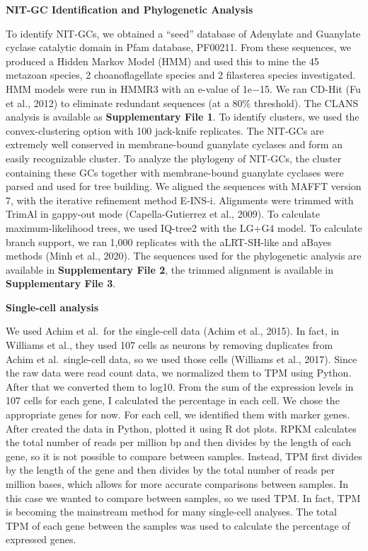 \documentclass[
  10pt,
  onecolumn]{article}
\begin{document}
\textbf{NIT-GC Identification and Phylogenetic Analysis}

To identify NIT-GCs, we obtained a ``seed'' database of Adenylate and
Guanylate cyclase catalytic domain in Pfam database, PF00211. From these
sequences, we produced a Hidden Markov Model (HMM) and used this to mine
the 45 metazoan species, 2 choanoflagellate species and 2 filasterea
species investigated. HMM models were run in HMMR3 with an e-value of
1e−15. We ran CD-Hit (Fu et al., 2012) to eliminate redundant sequences
(at a 80\% threshold). The CLANS analysis is available as
\textbf{Supplementary File 1}. To identify clusters, we used the
convex-clustering option with 100 jack-knife replicates. The NIT-GCs are
extremely well conserved in membrane-bound guanylate cyclases and form
an easily recognizable cluster. To analyze the phylogeny of NIT-GCs, the
cluster containing these GCs together with membrane-bound guanylate
cyclases were parsed and used for tree building. We aligned the
sequences with MAFFT version 7, with the iterative refinement method
E-INS-i. Alignments were trimmed with TrimAl in gappy-out mode
(Capella-Gutierrez et al., 2009). To calculate maximum-likelihood trees,
we used IQ-tree2 with the LG+G4 model. To calculate branch support, we
ran 1,000 replicates with the aLRT-SH-like and aBayes methods (Minh et
al., 2020). The sequences used for the phylogenetic analysis are
available in \textbf{Supplementary File 2}, the trimmed alignment is
available in \textbf{Supplementary File 3}.

\textbf{Single-cell analysis}

We used Achim et al.~for the single-cell data (Achim et al., 2015). In
fact, in Williams et al., they used 107 cells as neurons by removing
duplicates from Achim et al.~single-cell data, so we used those cells
(Williams et al., 2017). Since the raw data were read count data, we
normalized them to TPM using Python. After that we converted them to
log10. From the sum of the expression levels in 107 cells for each gene,
I calculated the percentage in each cell. We chose the appropriate genes
for now. For each cell, we identified them with marker genes. After
created the data in Python, plotted it using R dot plots. RPKM
calculates the total number of reads per million bp and then divides by
the length of each gene, so it is not possible to compare between
samples. Instead, TPM first divides by the length of the gene and then
divides by the total number of reads per million bases, which allows for
more accurate comparisons between samples. In this case we wanted to
compare between samples, so we used TPM. In fact, TPM is becoming the
mainstream method for many single-cell analyses. The total TPM of each
gene between the samples was used to calculate the percentage of
expressed genes.
\end{document}
